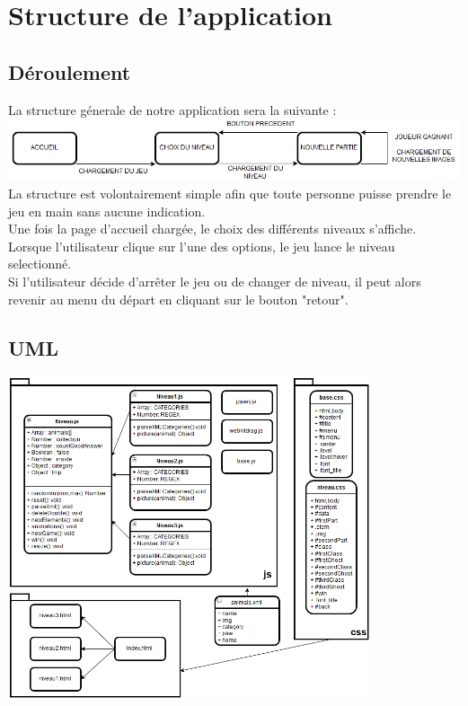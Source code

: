\documentclass{article}
\begin{document}
\section{Structure de l'application}

\subsection{Déroulement}

La structure génerale de notre application sera la suivante :
\vspace{0.5cm}\\
\includegraphics[width=\textwidth]{plan}
\vspace{0.5cm}\\
\hspace*{0.6cm}La structure est volontairement simple afin que toute personne puisse prendre le jeu en main sans aucune indication.\\
Une fois la page d'accueil chargée, le choix des différents niveaux s'affiche. Lorsque l'utilisateur clique sur l'une des options, le jeu lance le niveau selectionné.\\
Si l'utilisateur décide d'arrêter le jeu ou de changer de niveau, il peut alors revenir au menu du départ en cliquant sur le bouton "retour". 

\subsection{UML}

\begin{center}
\includegraphics[width=0.8\textwidth]{planUml}\\
\end{center}
\end{document}
